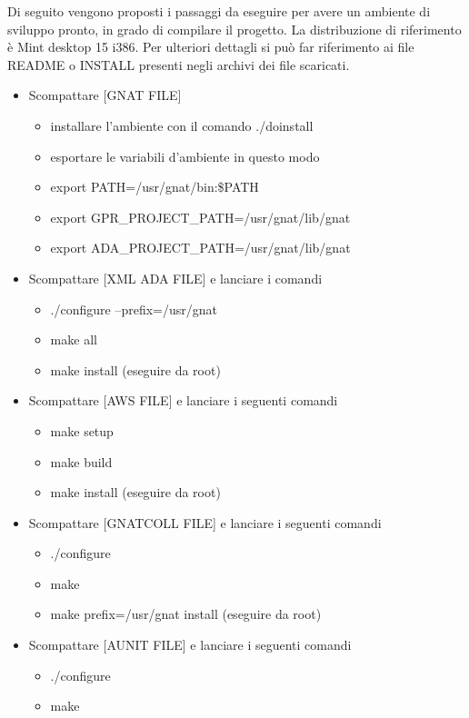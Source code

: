 \noindent Di seguito vengono proposti i passaggi da eseguire per avere un ambiente di sviluppo pronto, in grado di compilare il progetto. La distribuzione di riferimento \`{e} Mint desktop 15 i386. Per ulteriori dettagli si pu\`{o} far riferimento ai file README o INSTALL presenti negli archivi dei file scaricati.
\begin{itemize}
	\item Scompattare [GNAT FILE]
		\begin{itemize}
			\item[] installare l'ambiente con il comando ./doinstall
			\item[] esportare le variabili d'ambiente in questo modo
			\item[] export PATH=/usr/gnat/bin:\$PATH
			\item[] export GPR\_PROJECT\_PATH=/usr/gnat/lib/gnat
			\item[] export ADA\_PROJECT\_PATH=/usr/gnat/lib/gnat
		\end{itemize}
	\item Scompattare [XML ADA FILE] e lanciare i comandi
		\begin{itemize}
			\item[] ./configure --prefix=/usr/gnat
			\item[] make all
			\item[] make install (eseguire da root)
		\end{itemize}
	\item Scompattare [AWS FILE] e lanciare i seguenti comandi
		\begin{itemize}
			\item[] make setup
			\item[] make build
			\item[] make install (eseguire da root)
		\end{itemize}
	\item Scompattare [GNATCOLL FILE] e lanciare i seguenti comandi
		\begin{itemize}
			\item[] ./configure
			\item[] make
			\item[] make prefix=/usr/gnat install (eseguire da root)
		\end{itemize}
	\item Scompattare [AUNIT FILE] e lanciare i seguenti comandi
		\begin{itemize}
			\item[] ./configure
			\item[] make

\end{itemize}
\end{itemize}
